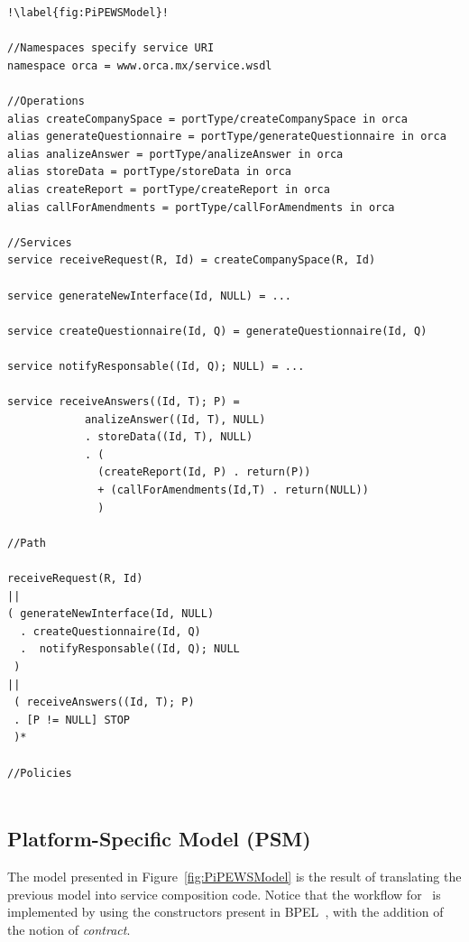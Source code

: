 \begin{lstlisting}[label=list:flyingPigPiPEWS,caption=pi-PEWS
Specification: FlyingPig. ]!\label{fig:PiPEWSModel}!

//Namespaces specify service URI
namespace orca = www.orca.mx/service.wsdl

//Operations
alias createCompanySpace = portType/createCompanySpace in orca
alias generateQuestionnaire = portType/generateQuestionnaire in orca
alias analizeAnswer = portType/analizeAnswer in orca
alias storeData = portType/storeData in orca
alias createReport = portType/createReport in orca
alias callForAmendments = portType/callForAmendments in orca

//Services
service receiveRequest(R, Id) = createCompanySpace(R, Id)

service generateNewInterface(Id, NULL) = ...

service createQuestionnaire(Id, Q) = generateQuestionnaire(Id, Q)

service notifyResponsable((Id, Q); NULL) = ...

service receiveAnswers((Id, T); P) =
			analizeAnswer((Id, T), NULL) 
			. storeData((Id, T), NULL)
			. (
			  (createReport(Id, P) . return(P))
			  + (callForAmendments(Id,T) . return(NULL))
			  )
  
//Path

receiveRequest(R, Id)
||
( generateNewInterface(Id, NULL)
  . createQuestionnaire(Id, Q)
  .  notifyResponsable((Id, Q); NULL
 )
||
 ( receiveAnswers((Id, T); P)
 . [P != NULL] STOP
 )*	
 
//Policies 					  


\end{lstlisting}
%

\subsection{Platform-Specific Model (PSM)}

The model presented in Figure~\ref{fig:PiPEWSModel} is the result of translating the previous model into service composition code.
Notice that the workflow for \FlyingPig\ is implemented by using the constructors present in BPEL~\cite{BPEL}, with the addition of the notion of \textit{contract}.

